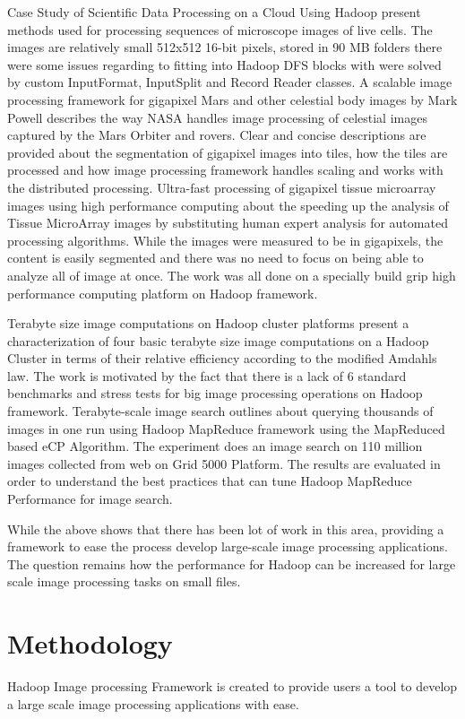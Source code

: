 \documentclass[conference]{IEEEtran}
\begin{document}
	Case Study of Scientific Data Processing on a Cloud Using Hadoop \cite{Zhang2010} present methods used for processing sequences of microscope images of live cells. The images are relatively small 512x512 16-bit pixels, stored in 90 MB folders there were some issues regarding to fitting into Hadoop DFS blocks with were solved by custom InputFormat, InputSplit and Record Reader classes. A scalable image processing framework for gigapixel Mars and other celestial body images by Mark Powell describes the way NASA handles image processing of celestial images captured by the Mars Orbiter and rovers. Clear and concise descriptions are provided about the segmentation of gigapixel images into tiles, how the tiles are processed and how image processing framework handles scaling and works with the distributed processing. Ultra-fast processing of gigapixel tissue microarray images using high performance computing \cite{Wang2011} about the speeding up the analysis of Tissue MicroArray images by substituting human expert analysis for automated processing algorithms. While the images were measured to be in gigapixels, the content is easily segmented and there was no need to focus on being able to analyze all of image at once. The work was all done on a specially build grip high performance	computing platform on Hadoop framework. 
	
	Terabyte size image computations on Hadoop cluster \cite{Bajcsy2013} platforms present a characterization of four basic terabyte size image computations on a Hadoop Cluster in terms of their relative efficiency according to the modified Amdahls law. The work is motivated by the fact that there is a lack of 6 standard benchmarks and stress tests for big image processing operations on Hadoop framework. Terabyte-scale image search\cite{Moise2013} outlines about querying thousands of images in one run using Hadoop MapReduce framework using the MapReduced based eCP Algorithm. The experiment does an image search on 110 million images collected from web on Grid 5000 Platform. The results are evaluated in order to understand the best practices that can tune Hadoop MapReduce Performance for image search.	
	
	While the above shows that there has been lot of work in this area, providing a framework to ease the process develop large-scale image processing applications. The question remains how the performance for Hadoop can be increased for large scale image processing tasks on small files.
	
\section{Methodology}
Hadoop Image processing Framework is created to provide users a tool to develop a large scale image processing applications with ease.
\end{document}
